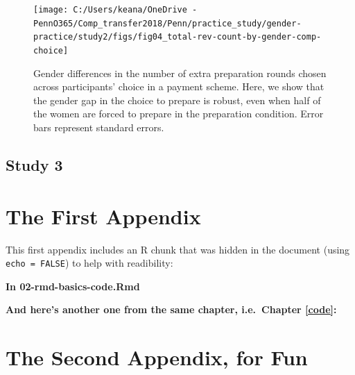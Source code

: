 \documentclass[a4paper, nobind]{templates/ociamthesis}
\newcommand*{\bibtitle}{Works Cited}
\begin{document}
\begin{figure}
\texttt{[image: C:/Users/keana/OneDrive - PennO365/Comp\_transfer2018/Penn/practice\_study/gender-practice/study2/figs/fig04\_total-rev-count-by-gender-comp-choice]} \caption{Gender differences in the number of extra preparation rounds chosen across participants' choice in a payment scheme. Here, we show that the gender gap in the choice to prepare is robust, even when half of the women are forced to prepare in the preparation condition. Error bars represent standard errors.}\label{fig:s204}
\end{figure}

\hypertarget{study-3}{%
\section{Study 3}\label{study-3}}

\startappendices

\hypertarget{the-first-appendix}{%
\chapter{The First Appendix}\label{the-first-appendix}}

This first appendix includes an R chunk that was hidden in the document (using \texttt{echo\ =\ FALSE}) to help with readibility:

\textbf{In 02-rmd-basics-code.Rmd}

\textbf{And here's another one from the same chapter, i.e.~Chapter \ref{code}:}

\hypertarget{the-second-appendix-for-fun}{%
\chapter{The Second Appendix, for Fun}\label{the-second-appendix-for-fun}}


\setlength{\baselineskip}{0pt} %

{\renewcommand*\MakeUppercase[1]{#1}%
\printbibliography[heading=bibintoc,title={\bibtitle}]}
\end{document}
